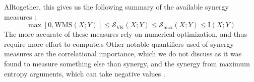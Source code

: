 \documentclass[../main.tex]{subfiles}
\begin{document}

Alltogether, this gives us the following summary of the available synergy measures \cite{griffith2014quantifying}:
%
\begin{equation}
\max [0,\mathrm{WMS}\left( X;Y \right)] \le \mathcal{S}_\mathrm{VK} \left( X;Y \right) \le \mathcal{S}_\mathrm{max} \left( X;Y \right) \le \mathrm{I}\left( X;Y \right)
\end{equation}
%
The more accurate of these measures rely on numerical optimization, and thus require more effort to compute.s
Other notable quantifiers used of synergy measures are the correlational importance, which we do not discuss as it was found to measure something else than synergy, and the synergy from maximum entropy arguments, which can take negative values \cite{griffith2014quantifying, olbrich2015information}.
\end{document}
